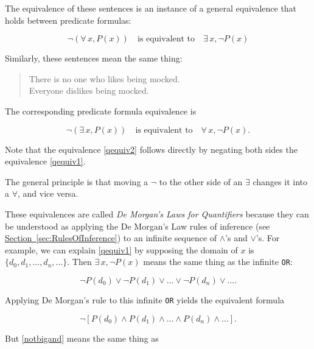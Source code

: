 \documentclass[11pt,oneside]{book}
\theoremstyle{definition}
\begin{document}
The equivalence of these sentences is an instance of a general equivalence that holds between predicate formulas:

\begin{equation}
    \lnot(\forall\, x, P(x)) \quad\text{is equivalent to}\quad \exists\, x, \lnot P(x) \label{qequiv1}
\end{equation}

Similarly, these sentences mean the same thing:

\begin{quote}
    There is no one who likes being mocked. \\
    Everyone dislikes being mocked.
\end{quote}

The corresponding predicate formula equivalence is

\begin{equation}
    \lnot(\exists\, x, P(x)) \quad\text{is equivalent to}\quad \forall\, x, \lnot P(x). \label{qequiv2}
\end{equation}

Note that the equivalence \eqref{qequiv2} follows directly by negating both sides the equivalence \eqref{qequiv1}.

The general principle is that moving a $\lnot$ to the other side of an $\exists$ changes it into a $\forall$, and vice versa.

These equivalences are called \emph{De Morgan's Laws for Quantifiers} because they can be understood as applying the De Morgan's Law rules of inference (see \hyperref[sec:RulesOfInference]{Section~\ref*{sec:RulesOfInference}}) to an infinite sequence of $\land$'s and $\lor$'s.
For example, we can explain \eqref{qequiv1} by supposing the domain of $x$ is $\{ d_{0}, d_{1}, \dots, d_{n}, \dots \}$.
Then $\exists\, x, \lnot P(x)$ means the same thing as the infinite \texttt{OR}:

\begin{equation} \lnot P(d_{0}) \lor \lnot P(d_{1}) \lor \dots \lor \lnot P(d_{n}) \lor \dots. \label{bigor} \end{equation}

Applying De Morgan's rule to this infinite \texttt{OR} yields the equivalent formula

\begin{equation} \lnot[P(d_{0}) \land P(d_{1}) \land \dots \land P(d_{n}) \land \dots]. \label{notbigand} \end{equation}

But \eqref{notbigand} means the same thing as
\end{document}
